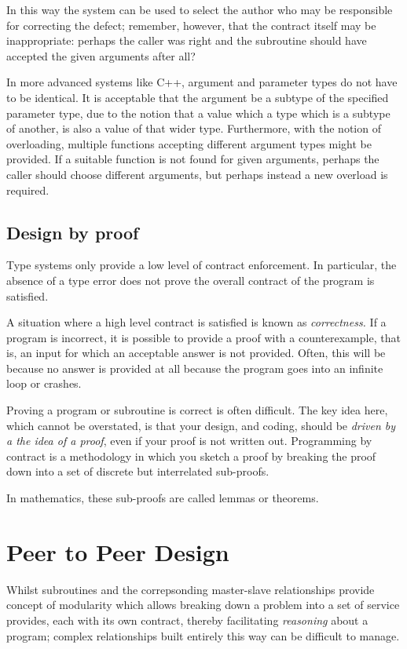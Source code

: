 \documentclass[oneside]{book}
\begin{document}
In this way the system can be used to select the author who
may be responsible for correcting the defect; remember, however,
that the contract itself may be inappropriate: perhaps the caller
was right and the subroutine should have accepted the given arguments
after all?

In more advanced systems like C++, argument and parameter types
do not have to be identical. It is acceptable that the argument
be a subtype of the specified parameter type, due to the notion
that a value which a type which is a subtype of another, is also
a value of that wider type. Furthermore, with the notion of overloading,
multiple functions accepting different argument types might be provided.
If a suitable function is not found for given arguments, perhaps
the caller should choose different arguments, but perhaps instead
a new overload is required.

\subsection{Design by proof}
Type systems only provide a low level of contract enforcement.
In particular, the absence of a type error does not prove
the overall contract of the program is satisfied.

A situation where a high level contract is satisfied is known
as {\em correctness.} If a program is incorrect, it is possible to
provide a proof with a counterexample, that is, an input for
which an acceptable answer is not provided. Often, this will
be because no answer is provided at all because the program
goes into an infinite loop or crashes.

Proving a program or subroutine is correct is often difficult.
The key idea here, which cannot be overstated, is that your
design, and coding, should be {\em driven by a the idea of a proof},
even if your proof is not written out. Programming by contract
is a methodology in which you sketch a proof by breaking the
proof down into a set of discrete but interrelated sub-proofs.

In mathematics, these sub-proofs are called lemmas or theorems.

\section{Peer to Peer Design}
Whilst subroutines and the correpsonding master-slave relationships
provide concept of modularity which allows breaking down a problem
into a set of service provides, each with its own contract,
thereby facilitating {\em reasoning} about a program; complex relationships
built entirely this way can be difficult to manage.
\end{document}
